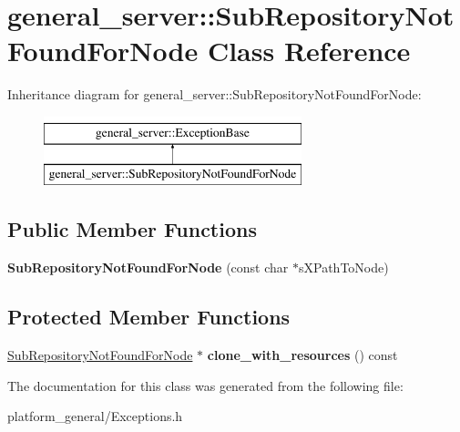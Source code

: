 \hypertarget{classgeneral__server_1_1SubRepositoryNotFoundForNode}{\section{general\-\_\-server\-:\-:\-Sub\-Repository\-Not\-Found\-For\-Node \-Class \-Reference}
\label{classgeneral__server_1_1SubRepositoryNotFoundForNode}
}
\-Inheritance diagram for general\-\_\-server\-:\-:\-Sub\-Repository\-Not\-Found\-For\-Node\-:\begin{figure}[H]
\begin{center}
\leavevmode
\includegraphics[height=2.000000cm]{classgeneral__server_1_1SubRepositoryNotFoundForNode}
\end{center}
\end{figure}
\subsection*{\-Public \-Member \-Functions}
\begin{DoxyCompactItemize}
\item 
\hypertarget{classgeneral__server_1_1SubRepositoryNotFoundForNode_a5a8731a6279e182c4ee1b0dfc81bcb2a}{{\bfseries \-Sub\-Repository\-Not\-Found\-For\-Node} (const char $\ast$s\-X\-Path\-To\-Node)}\label{classgeneral__server_1_1SubRepositoryNotFoundForNode_a5a8731a6279e182c4ee1b0dfc81bcb2a}

\end{DoxyCompactItemize}
\subsection*{\-Protected \-Member \-Functions}
\begin{DoxyCompactItemize}
\item 
\hypertarget{classgeneral__server_1_1SubRepositoryNotFoundForNode_ae263524d1bfc22f5fc6ae3a211eacc05}{\hyperlink{classgeneral__server_1_1SubRepositoryNotFoundForNode}{\-Sub\-Repository\-Not\-Found\-For\-Node} $\ast$ {\bfseries clone\-\_\-with\-\_\-resources} () const }\label{classgeneral__server_1_1SubRepositoryNotFoundForNode_ae263524d1bfc22f5fc6ae3a211eacc05}

\end{DoxyCompactItemize}


\-The documentation for this class was generated from the following file\-:\begin{DoxyCompactItemize}
\item 
platform\-\_\-general/\-Exceptions.\-h\end{DoxyCompactItemize}
